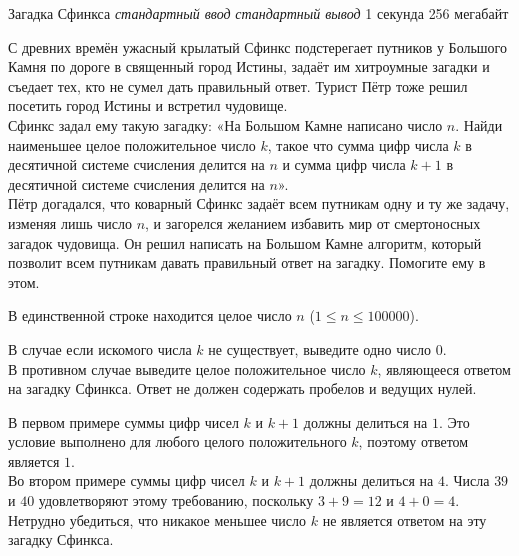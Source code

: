 \begin{problem}%
{Загадка Сфинкса}%
{\textsl{стандартный ввод}}%
{\textsl{стандартный вывод}}%
{1 секунда}%
{256 мегабайт}%
{}

С древних времён ужасный крылатый Сфинкс подстерегает путников у Большого Камня по дороге в священный город Истины, задаёт им хитроумные загадки и съедает тех, кто не сумел дать правильный ответ. Турист Пётр тоже решил посетить город Истины и встретил чудовище.\\

Сфинкс задал ему такую загадку: «На Большом Камне написано число $n$. Найди наименьшее целое положительное число $k$, такое что сумма цифр числа $k$ в десятичной системе счисления делится на $n$ и сумма цифр числа $k + 1$ в десятичной системе счисления делится на $n$».\\

Пётр догадался, что коварный Сфинкс задаёт всем путникам одну и ту же задачу, изменяя лишь число $n$, и загорелся желанием избавить мир от смертоносных загадок чудовища. Он решил написать на Большом Камне алгоритм, который позволит всем путникам давать правильный ответ на загадку. Помогите ему в этом.

\InputFile

В единственной строке находится целое число $n$ ($1 \le n \le 100000$).

\OutputFile

В случае если искомого числа $k$ не существует, выведите одно число $0$.\\

В противном случае выведите целое положительное число $k$, являющееся ответом на загадку Сфинкса. Ответ не должен содержать пробелов и ведущих нулей.

\Examples

\begin{example}
%
%
\end{example}

\Explanation

В первом примере суммы цифр чисел $k$ и $k + 1$ должны делиться на $1$. Это условие выполнено для любого целого положительного $k$, поэтому ответом является $1$.\\

Во втором примере суммы цифр чисел $k$ и $k + 1$ должны делиться на $4$. Числа $39$ и $40$ удовлетворяют этому требованию, поскольку $3 + 9 = 12$ и $4 + 0 = 4$. Нетрудно убедиться, что никакое меньшее число $k$ не является ответом на эту загадку Сфинкса.

\end{problem}